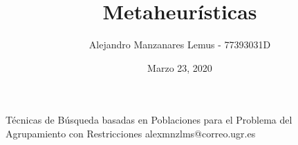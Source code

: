 \documentclass[10pt]{report}
\author{Alejandro Manzanares Lemus - 77393031D}
\title{Metaheurísticas}
\date{Marzo 23, 2020}
\begin{document}
				{Técnicas de Búsqueda basadas en Poblaciones para el Problema del Agrupamiento con Restricciones}
            {alexmnzlms@correo.ugr.es}

\tableofcontents

% 
% 
% 
% 
% 











% 
\end{document}
